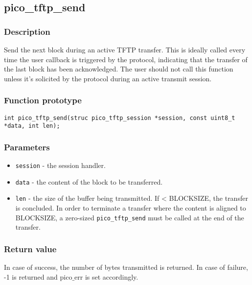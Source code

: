 
\subsection{pico\_tftp\_send}
\subsubsection*{Description}
Send the next block during an active TFTP transfer. This is ideally called every time the user callback is triggered by the protocol, indicating that the transfer of the last block has been acknowledged. The user should not call this function unless it's solicited by the protocol during an active transmit session.


\subsubsection*{Function prototype}
\begin{verbatim}
int pico_tftp_send(struc pico_tftp_session *session, const uint8_t *data, int len);
\end{verbatim}


\subsubsection*{Parameters}
\begin{itemize}[noitemsep]
\item \texttt{session} - the session handler.
\item \texttt{data} - the content of the block to be transferred.
\item \texttt{len} - the size of the buffer being transmitted. If < BLOCKSIZE, the transfer is concluded. In order to terminate a transfer where the content is aligned to BLOCKSIZE, a zero-sized \texttt{pico\_tftp\_send} must be called at the end of the transfer.
\end{itemize}

\subsubsection*{Return value}
In case of success, the number of bytes transmitted is returned. In case of failure, -1 is returned and pico$\_$err is set accordingly.


